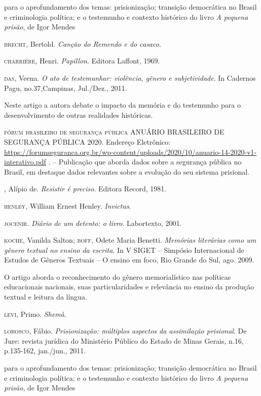 \documentclass[11pt]{extarticle}
\begin{document}
para o aprofundamento dos temas:
prisionização; transição democrática no Brasil e criminologia política;
e o testemunho e contexto histórico do livro \emph{A pequena prisão}, de
Igor Mendes

\textsc{brecht}, Bertold. \textit{Canção do Remendo e do casaco}. 

\textsc{charriére}, Henri. \textit{Papillon}. Editora Laffont, 1969.

\textsc{das}, Veena. \textit{O ato de testemunhar: violência, gênero e subjetividade}. In
Cadernos Pagu, no.37,Campinas, Jul./Dez., 2011. 

Neste artigo a autora debate o impacto da memória e do testemunho para o desenvolvimento 
de outras realidades históricas.

\textsc{fórum brasileiro de
segurança pública} ANUÁRIO BRASILEIRO DE SEGURANÇA PÚBLICA 2020. Endereço Eletrônico:
\url{https://forumseguranca.org.br/wp-content/uploads/2020/10/anuario-14-2020-v1-interativo.pdf}
. -- Publicação que aborda dados sobre a segurança pública no Brasil, em
destaque dados relevantes sobre a evolução do seu sistema prisional.

, Alípio de. \textit{Resistir é preciso}. Editora Record, 1981.

\textsc{henley}, William Ernest Henley. \textit{Invictus}.

\textsc{jocenir}. \textit{Diário de um detento: o livro}. Labortexto, 2001. 

\textsc{koche}, Vanilda Salton; \textsc{boff}, Odete Maria Benetti. \textit{Memórias literárias
como um gênero textual no ensino da escrita}. In V SIGET -- Simpósio
Internacional de Estudos de Gêneros Textuais -- O ensino em foco, Rio
Grande do Sul, ago. 2009. 

O artigo aborda o reconhecimento do gênero memorialístico nas políticas educacionais 
nacionais, suas particularidades e relevância no ensino da produção textual e leitura 
da língua.

\textsc{levi}, Primo. \textit{Shemà}. 

\textsc{lobosco}, Fábio. \textit{Prisionização: múltiplos aspectos da assimilação
prisional}. De Jure: revista jurídica do Ministério Público do Estado 
de Minas Gerais, n.16, p.135-162, jan./jun., 2011.

para o aprofundamento dos temas:
prisionização; transição democrática no Brasil e criminologia política;
e o testemunho e contexto histórico do livro \emph{A pequena prisão}, de
Igor Mendes
\end{document}
